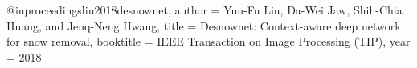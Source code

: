@inproceedings{liu2018desnownet,
  author = {Yun-Fu Liu, Da-Wei Jaw, Shih-Chia Huang, and Jenq-Neng Hwang},
  title = {Desnownet: Context-aware deep network for snow removal},
  booktitle = {IEEE Transaction on Image Processing (TIP)},
  year = {2018}
}

